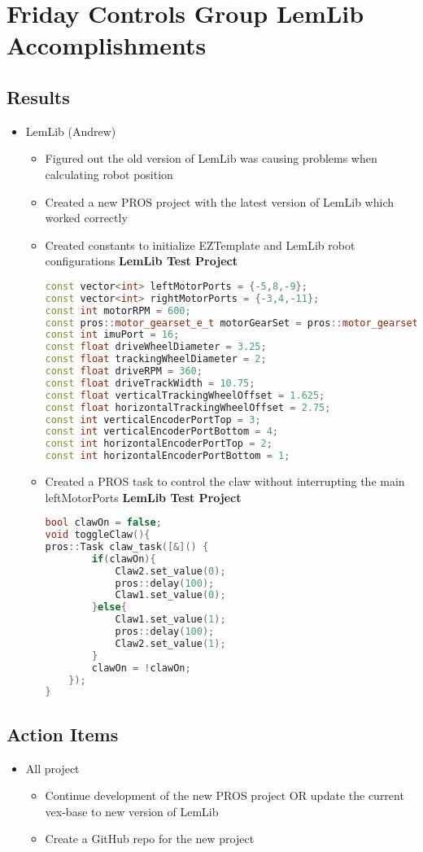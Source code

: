 \section{Friday Controls Group LemLib Accomplishments}

\subsection{Results}
\begin{itemize}
    \item LemLib (Andrew)
    \begin{itemize}
        \item Figured out the old version of LemLib was causing problems when calculating robot position
        \item Created a new PROS project with the latest version of LemLib which worked correctly
        \item Created constants to initialize EZTemplate and LemLib robot configurations
\textbf{LemLib Test Project}
\begin{lstlisting}[language=c++]
const vector<int> leftMotorPorts = {-5,8,-9};
const vector<int> rightMotorPorts = {-3,4,-11};
const int motorRPM = 600;
const pros::motor_gearset_e_t motorGearSet = pros::motor_gearset_e_t::E_MOTOR_GEAR_600;
const int imuPort = 16;
const float driveWheelDiameter = 3.25;
const float trackingWheelDiameter = 2;
const float driveRPM = 360;
const float driveTrackWidth = 10.75;
const float verticalTrackingWheelOffset = 1.625;
const float horizontalTrackingWheelOffset = 2.75;
const int verticalEncoderPortTop = 3;
const int verticalEncoderPortBottom = 4;
const int horizontalEncoderPortTop = 2;
const int horizontalEncoderPortBottom = 1;
\end{lstlisting}

        \item Created a PROS task to control the claw without interrupting the main leftMotorPorts
\textbf{LemLib Test Project}
\begin{lstlisting}[language=c++]
bool clawOn = false;
void toggleClaw(){
pros::Task claw_task([&]() {
        if(clawOn){
            Claw2.set_value(0);
            pros::delay(100);
            Claw1.set_value(0);
        }else{
            Claw1.set_value(1);
            pros::delay(100);
            Claw2.set_value(1);
        }
        clawOn = !clawOn;
    });
}
\end{lstlisting}
    \end{itemize}
\end{itemize}

\subsection{Action Items}
\begin{itemize}
    \item All project
    \begin{itemize}
        \item Continue development of the new PROS project OR update the current vex-base to new version of LemLib
        \item Create a GitHub repo for the new project
    \end{itemize}
\end{itemize}
